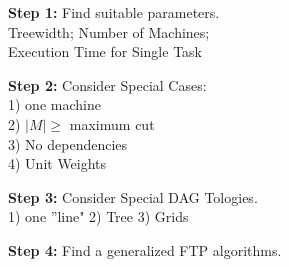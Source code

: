 \Large

\textbf{Step 1:}  Find suitable parameters. \\
Treewidth; Number of Machines; \\
Execution Time for Single Task
 
\textbf{Step 2:} Consider Special Cases:\\
1) one machine \\
2) $|M|\geq$ maximum cut \\
3) No dependencies \\
4) Unit Weights

\textbf{Step 3:} Consider Special DAG Tologies.\\
1) one ''line" 2) Tree 3) Grids

\textbf{Step 4:} Find a generalized FTP algorithms.
